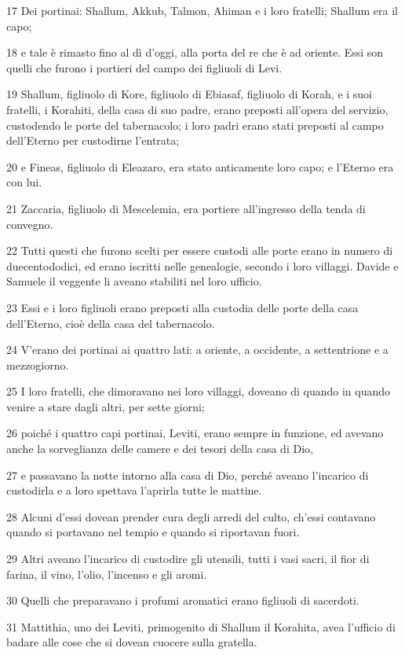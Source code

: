 \par 17 Dei portinai: Shallum, Akkub, Talmon, Ahiman e i loro fratelli; Shallum era il capo;
\par 18 e tale è rimasto fino al dì d'oggi, alla porta del re che è ad oriente. Essi son quelli che furono i portieri del campo dei figliuoli di Levi.
\par 19 Shallum, figliuolo di Kore, figliuolo di Ebiasaf, figliuolo di Korah, e i suoi fratelli, i Korahiti, della casa di suo padre, erano preposti all'opera del servizio, custodendo le porte del tabernacolo; i loro padri erano stati preposti al campo dell'Eterno per custodirne l'entrata;
\par 20 e Fineas, figliuolo di Eleazaro, era stato anticamente loro capo; e l'Eterno era con lui.
\par 21 Zaccaria, figliuolo di Mescelemia, era portiere all'ingresso della tenda di convegno.
\par 22 Tutti questi che furono scelti per essere custodi alle porte erano in numero di duecentododici, ed erano iscritti nelle genealogie, secondo i loro villaggi. Davide e Samuele il veggente li aveano stabiliti nel loro ufficio.
\par 23 Essi e i loro figliuoli erano preposti alla custodia delle porte della casa dell'Eterno, cioè della casa del tabernacolo.
\par 24 V'erano dei portinai ai quattro lati: a oriente, a occidente, a settentrione e a mezzogiorno.
\par 25 I loro fratelli, che dimoravano nei loro villaggi, doveano di quando in quando venire a stare dagli altri, per sette giorni;
\par 26 poiché i quattro capi portinai, Leviti, erano sempre in funzione, ed avevano anche la sorveglianza delle camere e dei tesori della casa di Dio,
\par 27 e passavano la notte intorno alla casa di Dio, perché aveano l'incarico di custodirla e a loro spettava l'aprirla tutte le mattine.
\par 28 Alcuni d'essi dovean prender cura degli arredi del culto, ch'essi contavano quando si portavano nel tempio e quando si riportavan fuori.
\par 29 Altri aveano l'incarico di custodire gli utensili, tutti i vasi sacri, il fior di farina, il vino, l'olio, l'incenso e gli aromi.
\par 30 Quelli che preparavano i profumi aromatici erano figliuoli di sacerdoti.
\par 31 Mattithia, uno dei Leviti, primogenito di Shallum il Korahita, avea l'ufficio di badare alle cose che si dovean cuocere sulla gratella.
